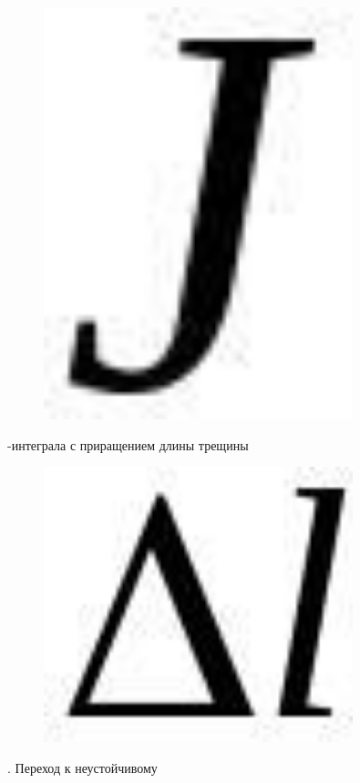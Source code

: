 \begin{figure}[H]
	\centering
	\includegraphics[width=0.8\textwidth]{assets/1197}
	\caption*{}
\end{figure}-интеграла с приращением длины
трещины \begin{figure}[H]
	\centering
	\includegraphics[width=0.8\textwidth]{assets/1198}
	\caption*{}
\end{figure}. Переход к неустойчивому
